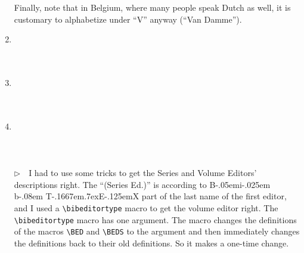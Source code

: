 \documentclass{article}
\newcommand{\bibeditortype}[1]{\relax}%
\def\BibTeX{{\rm B\kern-.05em{\sc i\kern-.025em b}\kern-.08em
    T\kern-.1667em\lower.7ex\hbox{E}\kern-.125emX}}%
\newcommand{\EM}{\ensuremath{\triangleright\quad}}
\begin{document}
\begin{enumerate}
      Finally, note that in Belgium, where many people
      speak Dutch as well, it is customary to alphabetize under ``V''
      anyway (``Van Damme'').
\item \cite{ex34} \\ \cite{ex34}\\ \\ 
\item \cite{ex35} \\ \cite{ex35}\\ \\ 
\item \cite{ex36} \\ \cite{ex36}\\ \\ \\
      \EM I had to use some tricks to get the Series and Volume Editors'
      descriptions right. The ``(Series Ed.)'' is according to
      \BibTeX{} part of the last name of the first editor,
      and I used a \verb+\bibeditortype+ macro to get the volume
      editor right. The \verb+\bibeditortype+ macro has one argument.
      The macro changes the definitions of the macros \verb+\BED+ and
      \verb+\BEDS+ to the argument and then immediately changes the
      definitions back to their old definitions. So it makes a one-time
      change.


\end{enumerate}
\end{document}
